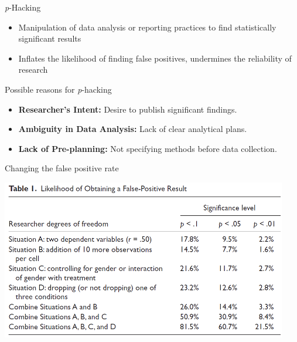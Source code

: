 \documentclass[
  ignorenonframetext,
  aspectratio=169,
]{beamer}
\providecommand{\tightlist}{%
  \setlength{\itemsep}{0pt}\setlength{\parskip}{0pt}}\usepackage{longtable,booktabs,array}
\begin{document}
\begin{frame}{\emph{p}-Hacking}
\label{p-hacking}
\begin{itemize}[<+->]
\tightlist
\item
  Manipulation of data analysis or reporting practices to find
  statistically significant results
\item
  Inflates the likelihood of finding false positives, undermines the
  reliability of research
\end{itemize}
\end{frame}

\begin{frame}{Possible reasons for \emph{p}-hacking}
\label{possible-reasons-for-p-hacking}
\begin{itemize}[<+->]
\tightlist
\item
  \textbf{Researcher's Intent:} Desire to publish significant findings.
\item
  \textbf{Ambiguity in Data Analysis:} Lack of clear analytical plans.
\item
  \textbf{Lack of Pre-planning:} Not specifying methods before data
  collection.
\end{itemize}
\end{frame}

\begin{frame}{Changing the false positive rate}
\label{changing-the-false-positive-rate}
\end{frame}

\begin{frame}{\begin{center}
\includegraphics{figs/p-Hacking-table.png}
\end{center}
}
\label{section-1}
\end{frame}
\end{document}
